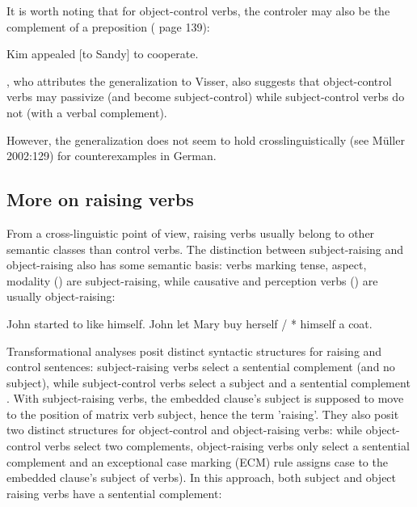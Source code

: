 \documentclass[output=paper
                ,modfonts
                ,nonflat
	        ,collection
	        ,collectionchapter
	        ,collectiontoclongg
 	        ,biblatex
                ,babelshorthands
                ,newtxmath
                ,draftmode
                ,colorlinks, citecolor=brown
]{./langsci/langscibook}
\begin{document}
It is worth noting that for object-control verbs, the controler may also be the complement of a preposition (\citep{PollardandSag1994} page 139):

\begin{exe}
\ex Kim appealed [to Sandy] to cooperate. \label{to}
\end{exe}


 
 \citet{Bresnan1982}, who attributes the generalization to Visser, also suggests that object-control verbs may passivize (and become subject-control) while subject-control verbs do not (with a verbal complement).
 
\eal
{}\label{persuade-pass}
\label{promise-pass}
\zl
 However, the generalization does not seem to hold crosslinguistically (see Müller 2002:129) for counterexamples in German.
 
\subsection{More on raising verbs}

	From a cross-linguistic point of view, raising verbs usually belong to other semantic classes than control verbs. The distinction between subject-raising and object-raising also has some semantic basis: verbs marking tense, aspect, modality () are subject-raising, while
causative and perception verbs () are usually object-raising:

	\begin{exe}
\ex  \begin{xlist}
\ex John started to like himself.
\ex John let Mary buy herself / * himself a coat.
	 \end{xlist}
	 \end{exe}
	

Transformational analyses posit distinct syntactic structures for raising and control sentences: subject-raising verbs select a sentential complement (and no subject), while subject-control verbs select a subject and a sentential complement \citep{Postal1974, Chomsky1981}. With subject-raising verbs, the embedded clause's subject is supposed to move to the position of matrix verb subject, hence the  term 'raising'. They also posit two distinct structures for object-control and object-raising verbs: while object-control verbs select two complements, object-raising verbs only select a sentential complement and
an exceptional case marking (ECM) rule assigns case to the embedded clause's subject of  verbs).
In this approach, both subject and object raising verbs have a sentential complement:
	
\end{document}
